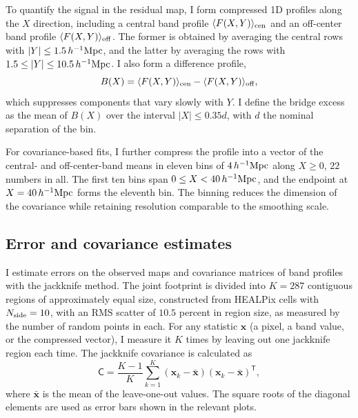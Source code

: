 \documentclass[11pt,letterpaper]{article}
\newcommand{\hinvMpc}{h^{-1}{\rm Mpc}}
\begin{document}
To quantify the signal in the residual map, I form compressed 1D profiles along the $X$ direction, including a central band profile $\langle F(X,Y)\rangle_{\rm cen}$ and an off-center band profile $\langle F(X,Y)\rangle_{\rm off}$. The former is obtained by averaging the central rows with $|Y|\leq1.5\,\hinvMpc$, and the latter by averaging the rows with $1.5\leq|Y|\leq10.5\,\hinvMpc$. I also form a difference profile, 
\begin{equation}
    B(X)=\langle F(X,Y)\rangle_{\rm cen} - \langle F(X,Y)\rangle_{\rm off},
    \label{eq:band}
\end{equation}
which suppresses components that vary slowly with $Y$. I define the bridge excess as the mean of $B(X)$ over the interval $|X|\leq 0.35 d$, with $d$ the nominal separation of the bin.

For covariance-based fits, I further compress the profile into a vector of the
central- and off-center-band means in eleven bins of
$4\,\hinvMpc$ along $X\geq0$, $22$ numbers in all. The first ten bins span
$0\leq X<40\,\hinvMpc$, and the endpoint at $X=40\,\hinvMpc$ forms the
eleventh bin. The binning reduces the dimension of the covariance while
retaining resolution comparable to the smoothing scale.

\subsection{Error and covariance estimates}
\label{sec:errors}

I estimate errors on the observed maps and covariance matrices of band profiles with the jackknife method. 
The joint footprint is divided into $K=287$ contiguous regions of
approximately equal size, constructed from HEALPix cells with
$N_{\rm side}=10$, with an RMS scatter of $10.5$ percent in region size, as
measured by the number of random points in each.
For any statistic $\mathbf{x}$ (a pixel, a band value, or the compressed vector), I measure it $K$ times by leaving out one jackknife region each time. The jackknife 
covariance is calculated as
\begin{equation}
  \mathsf{C}=\frac{K-1}{K}\sum_{k=1}^{K}(\mathbf{x}_{k}-\bar{\mathbf{x}})
                                          (\mathbf{x}_{k}-\bar{\mathbf{x}})^{\mathsf T},
  \label{eq:jackknife}
\end{equation}
where $\bar{\mathbf{x}}$ is the mean of the leave-one-out values. The square roots of the diagonal elements are used as error bars shown in the relevant plots. 
\end{document}
